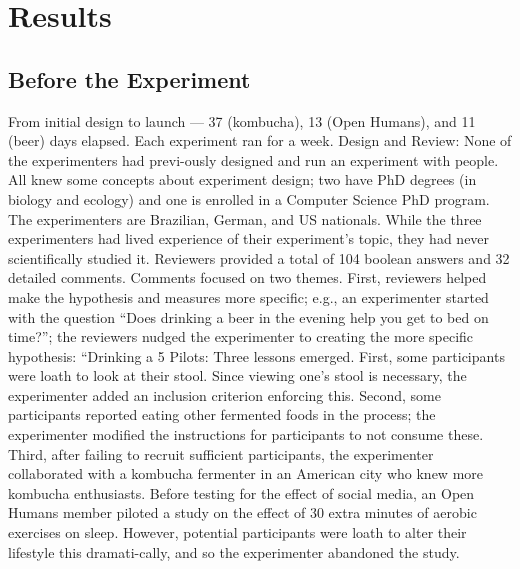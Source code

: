 \section{Results}
\subsection{Before the Experiment}
From initial design to launch — 37 (kombucha), 13 (Open Humans), and 11 (beer) days elapsed. Each experiment ran for a week.
Design and Review: None of the experimenters had previ-ously designed and run an experiment with people. All knew some concepts about experiment design; two have PhD degrees (in biology and ecology) and one is enrolled in a Computer Science PhD program. The experimenters are Brazilian, German, and US nationals. While the three experimenters had lived experience of their experiment’s topic, they had never scientifically studied it.
Reviewers provided a total of 104 boolean answers and 32 detailed comments. Comments focused on two themes. First, reviewers helped make the hypothesis and measures more specific; e.g., an experimenter started with the question “Does drinking a beer in the evening help you get to bed on time?”; the reviewers nudged the experimenter to creating the more specific hypothesis: “Drinking a 5%
Pilots: Three lessons emerged. First, some participants were loath to look at their stool. Since viewing one’s stool is necessary, the experimenter added an inclusion criterion enforcing this. Second, some participants reported eating other fermented foods in the process; the experimenter modified the instructions for participants to not consume these. Third, after failing to recruit sufficient participants, the experimenter collaborated with a kombucha fermenter in an American city who knew more kombucha enthusiasts. Before testing for the effect of social media, an Open Humans member piloted a study on the effect of 30 extra minutes of aerobic exercises on sleep. However, potential participants were loath to alter their lifestyle this dramati-cally, and so the experimenter abandoned the study. 
